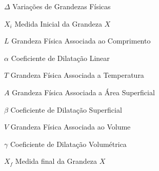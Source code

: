 \listoftables*
\cleardoublepage

\listofquadros*
\cleardoublepage



\cleardoublepage

\begin{simbolos}  
  \item[$\Delta$] Variações de Grandezas Físicas
  \item[$X_i$] Medida Inicial da Grandeza $X$
  \item[$L$] Grandeza Física Associada ao Comprimento
  \item[$\alpha$] Coeficiente de Dilatação Linear
  \item[$T$] Grandeza Física Associada a Temperatura
  \item[$A$] Grandeza Física Associada a Área Superficial
  \item[$\beta$] Coeficiente de Dilatação Superficial
  \item[$V$] Grandeza Física Associada ao Volume
  \item[$\gamma$] Coeficiente de Dilatação Volumétrica 
  \item[$X_f$] Medida final da Grandeza $X$
\end{simbolos}

\tableofcontents*
\cleardoublepage
